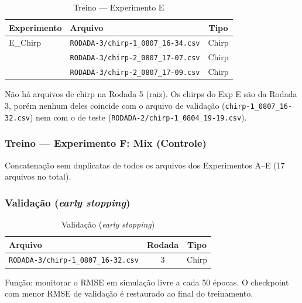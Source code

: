 \documentclass[11pt,a4paper]{article}
\begin{document}
\begin{table}[hbt!]
\centering
\caption{Treino --- Experimento E}
\vspace{0.2cm}
\begin{tabular}{llc}
\toprule
\textbf{Experimento} & \textbf{Arquivo} & \textbf{Tipo} \\
\midrule
E\_Chirp & \texttt{RODADA-3/chirp-1\_0807\_16-34.csv} & Chirp \\
 & \texttt{RODADA-3/chirp-2\_0807\_17-07.csv} & Chirp \\
 & \texttt{RODADA-3/chirp-2\_0807\_17-09.csv} & Chirp \\
\bottomrule
\end{tabular}
\end{table}

\begin{tcolorbox}[colback=blue!5!white,colframe=blue!75!black,title=Nota]
Não há arquivos de chirp na Rodada 5 (raiz). Os chirps do Exp E são da Rodada 3, porém nenhum deles coincide com o arquivo de validação (\texttt{chirp-1\_0807\_16-32.csv}) nem com o de teste (\texttt{RODADA-2/chirp-1\_0804\_19-19.csv}).
\end{tcolorbox}

\subsubsection*{Treino — Experimento F: Mix (Controle)}

Concatenação sem duplicatas de todos os arquivos dos Experimentos A--E (17 arquivos no total).

\subsubsection*{Validação (\textit{early stopping})}

\begin{table}[hbt!]
\centering
\caption{Validação (\textit{early stopping})}
\vspace{0.2cm}
\begin{tabular}{lcc}
\toprule
\textbf{Arquivo} & \textbf{Rodada} & \textbf{Tipo} \\
\midrule
\texttt{RODADA-3/chirp-1\_0807\_16-32.csv} & 3 & Chirp \\
\bottomrule
\end{tabular}
\end{table}

Função: monitorar o RMSE em simulação livre a cada 50 épocas. O checkpoint com menor RMSE de validação é restaurado ao final do treinamento.
\end{document}

